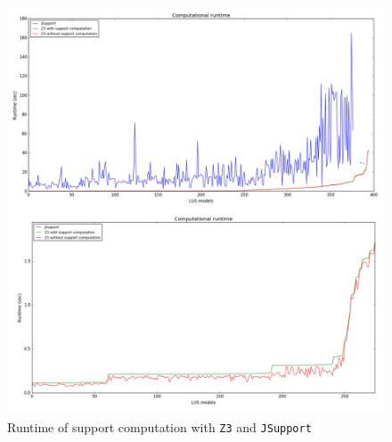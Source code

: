 \begin{figure}
  \centering
  \includegraphics[width=\textwidth]{figs/runtimeZ3.png}
  \caption{\small{Runtime of support computation with \texttt{Z3} and \texttt{JSupport}}}\label{fig:runtimez3}
\end{figure}

